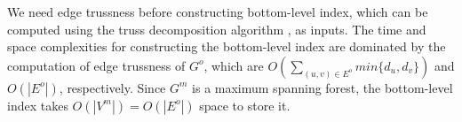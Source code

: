 
We need edge trussness before constructing bottom-level index, which can be computed using the truss decomposition algorithm \cite{wang2012truss}, as inputs. The time and space complexities for constructing the bottom-level index are dominated by the computation of edge trussness of $G^o$, which are $O(\sum_{(u,v) \in E^{o}}{min\{d_{u},d_{v}\}})$ and $O(|E^{o}|)$,  respectively. Since $G^m$ is a maximum spanning forest, the bottom-level index takes $O(|V^{m}|) = O(|E^{o}|)$ space to store it.

\subsubsection{\TreeIndex{}}
\label{top-level}

